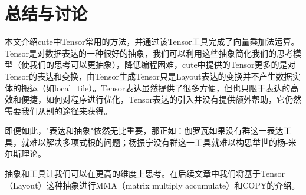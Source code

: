 \section{总结与讨论}

本文介绍cute中Tensor常用的方法，并通过该Tensor工具完成了向量乘加法运算。Tensor是对数据表达的一种很好的抽象，我们可以利用这些抽象简化我们的思考模型（使我们的思考可以更抽象），降低编程困难，cute中提供的Tensor更多的是对Tensor的表达和变换，由Tensor生成Tensor只是Layout表达的变换并不产生数据实体的搬运（如local\_tile）。Tensor表达虽然提供了很多方便，但也只限于表达的高效和便捷，如何对程序进行优化，Tensor表达的引入并没有提供额外帮助，它仍然需要我们从别的途径来获得。

即便如此，"表达和抽象"依然无比重要，那正如：伽罗瓦如果没有群这一表达工具，就难以解决多项式根的问题；杨振宁没有群这一工具就难以构思举世的杨-米尔斯理论。

抽象和工具让我们可以在更高的维度上思考。在后续文章中我们将基于Tensor（Layout）这种抽象进行MMA（matrix multiply accumulate）和COPY的介绍。

